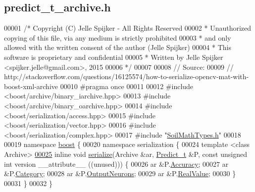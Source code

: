 \hypertarget{predict__t__archive_8h_source}{}\subsection{predict\+\_\+t\+\_\+archive.\+h}
\label{predict__t__archive_8h_source}

\begin{DoxyCode}
00001 \textcolor{comment}{/* Copyright (C) Jelle Spijker - All Rights Reserved}
00002 \textcolor{comment}{ * Unauthorized copying of this file, via any medium is strictly prohibited}
00003 \textcolor{comment}{ * and only allowed with the written consent of the author (Jelle Spijker)}
00004 \textcolor{comment}{ * This software is proprietary and confidential}
00005 \textcolor{comment}{ * Written by Jelle Spijker <spijker.jelle@gmail.com>, 2015}
00006 \textcolor{comment}{ */}
00007 
00008 \textcolor{comment}{// Source:}
00009 \textcolor{comment}{// http://stackoverflow.com/questions/16125574/how-to-serialize-opencv-mat-with-boost-xml-archive}
00010 \textcolor{preprocessor}{#pragma once}
00011 
00012 \textcolor{preprocessor}{#include <boost/archive/binary\_iarchive.hpp>}
00013 \textcolor{preprocessor}{#include <boost/archive/binary\_oarchive.hpp>}
00014 \textcolor{preprocessor}{#include <boost/serialization/access.hpp>}
00015 \textcolor{preprocessor}{#include <boost/serialization/vector.hpp>}
00016 \textcolor{preprocessor}{#include <boost/serialization/complex.hpp>}
00017 \textcolor{preprocessor}{#include "\hyperlink{_soil_math_types_8h}{SoilMathTypes.h}"}
00018 
00019 \textcolor{keyword}{namespace }\hyperlink{namespaceboost}{boost} \{
00020 \textcolor{keyword}{namespace }serialization \{
00024 \textcolor{keyword}{template} <\textcolor{keyword}{class} Archive>
\hypertarget{predict__t__archive_8h_source_l00025}{}\hyperlink{namespaceboost_1_1serialization_ad463c4b6874e90eced139f8b1a7abdc3}{00025} \textcolor{keyword}{inline} \textcolor{keywordtype}{void} \hyperlink{namespaceboost_1_1serialization_acf3ecd0fdaa3726a2332e266a4ecfe47}{serialize}(Archive &ar, \hyperlink{struct_predict__struct}{Predict\_t} &P, \textcolor{keyword}{const} \textcolor{keywordtype}{unsigned} \textcolor{keywordtype}{int} version \_\_attribute\_\_
      ((unused))) \{
00026   ar &P.\hyperlink{struct_predict__struct_a587f18ac05cd65437327a54261d1e22c}{Accuracy};
00027   ar &P.\hyperlink{struct_predict__struct_a7d1bc56f771ba19cb333163557648714}{Category};
00028   ar &P.\hyperlink{struct_predict__struct_aa0708cae93baa061f21452537e86d3bd}{OutputNeurons};
00029   ar &P.\hyperlink{struct_predict__struct_a09932ff9ac15e4b182bf6e53232eba0f}{RealValue};
00030 \}
00031 \}
00032 \}
\end{DoxyCode}
